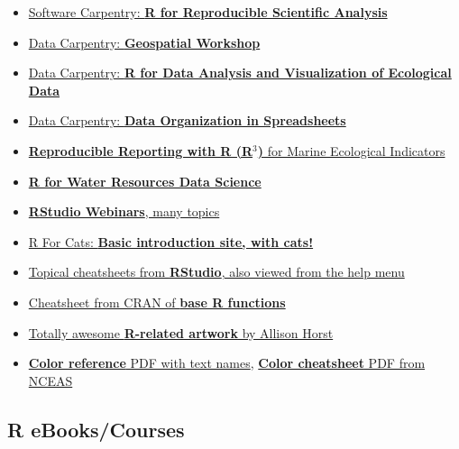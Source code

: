 \documentclass[
]{book}
\providecommand{\tightlist}{%
  \setlength{\itemsep}{0pt}\setlength{\parskip}{0pt}}
\begin{document}
\begin{itemize}
\tightlist
\item
  \href{http://data-lessons.github.io/gapminder-R/}{Software Carpentry: \textbf{R for Reproducible Scientific Analysis}}
\item
  \href{https://datacarpentry.org/geospatial-workshop/}{Data Carpentry: \textbf{Geospatial Workshop}}
\item
  \href{http://www.datacarpentry.org/R-ecology-lesson/}{Data Carpentry: \textbf{R for Data Analysis and Visualization of Ecological Data}}
\item
  \href{http://www.datacarpentry.org/spreadsheet-ecology-lesson/}{Data Carpentry: \textbf{Data Organization in Spreadsheets}}
\item
  \href{https://noaa-iea.github.io/r3-train/}{\textbf{Reproducible Reporting with R (R\(^3\))} for Marine Ecological Indicators}
\item
  \href{https://www.r4wrds.com/}{\textbf{R for Water Resources Data Science}}
\item
  \href{https://www.rstudio.com/resources/webinars/}{\textbf{RStudio Webinars}, many topics}
\item
  \href{http://rforcats.net/}{R For Cats: \textbf{Basic introduction site, with cats!}}
\item
  \href{http://www.rstudio.com/resources/cheatsheets/}{Topical cheatsheets from \textbf{RStudio}, also viewed from the help menu}
\item
  \href{http://cran.r-project.org/doc/contrib/Short-refcard.pdf}{Cheatsheet from CRAN of \textbf{base R functions}}
\item
  \href{https://github.com/allisonhorst/stats-illustrations}{Totally awesome \textbf{R-related artwork} by Allison Horst}
\item
  \href{http://www.stat.columbia.edu/~tzheng/files/Rcolor.pdf}{\textbf{Color reference} PDF with text names}, \href{https://www.nceas.ucsb.edu/sites/default/files/2020-04/colorPaletteCheatsheet.pdf}{\textbf{Color cheatsheet} PDF from NCEAS}
\end{itemize}

\subsection{R eBooks/Courses}\label{r-ebookscourses}
\end{document}
